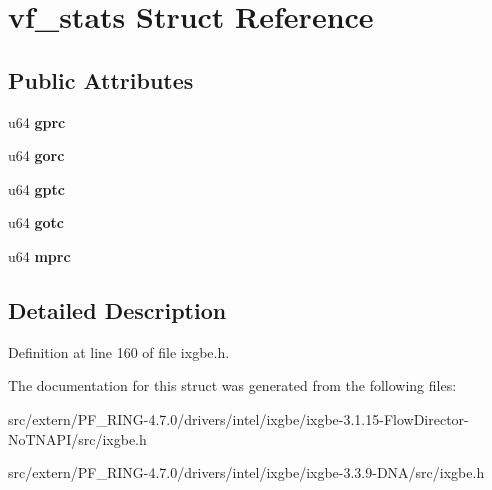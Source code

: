 \hypertarget{structvf__stats}{
\section{vf\_\-stats Struct Reference}
\label{structvf__stats}
}
\subsection*{Public Attributes}
\begin{DoxyCompactItemize}
\item 
\hypertarget{structvf__stats_a144d11968f2b44dd7675d3535ed30afa}{
u64 {\bfseries gprc}}
\label{structvf__stats_a144d11968f2b44dd7675d3535ed30afa}

\item 
\hypertarget{structvf__stats_a742660339f0fc83c509405ec9de2ce53}{
u64 {\bfseries gorc}}
\label{structvf__stats_a742660339f0fc83c509405ec9de2ce53}

\item 
\hypertarget{structvf__stats_a2b13ba9dae54f06958539b6a643b1823}{
u64 {\bfseries gptc}}
\label{structvf__stats_a2b13ba9dae54f06958539b6a643b1823}

\item 
\hypertarget{structvf__stats_af85145d598c7ced62862ea0744682ef5}{
u64 {\bfseries gotc}}
\label{structvf__stats_af85145d598c7ced62862ea0744682ef5}

\item 
\hypertarget{structvf__stats_ac38884aa0f2646a22d4e1030b20686b0}{
u64 {\bfseries mprc}}
\label{structvf__stats_ac38884aa0f2646a22d4e1030b20686b0}

\end{DoxyCompactItemize}


\subsection{Detailed Description}


Definition at line 160 of file ixgbe.h.



The documentation for this struct was generated from the following files:\begin{DoxyCompactItemize}
\item 
src/extern/PF\_\-RING-\/4.7.0/drivers/intel/ixgbe/ixgbe-\/3.1.15-\/FlowDirector-\/NoTNAPI/src/ixgbe.h\item 
src/extern/PF\_\-RING-\/4.7.0/drivers/intel/ixgbe/ixgbe-\/3.3.9-\/DNA/src/ixgbe.h\end{DoxyCompactItemize}

